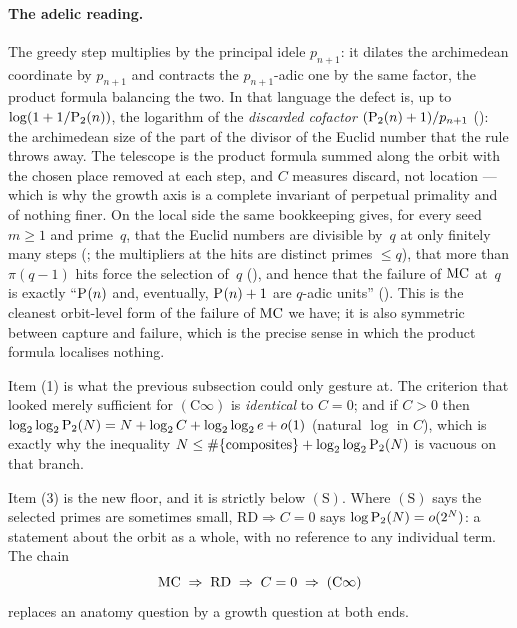 \paragraph{The adelic reading.}
The greedy step multiplies by the principal idele $p_{n+1}$: it dilates
the archimedean coordinate by $p_{n+1}$ and contracts the $p_{n+1}$-adic
one by the same factor, the product formula balancing the two.  In that
language the defect is, up to $\log(1 + 1/\mathrm{P}_{2}(n))$, the logarithm of
the \emph{discarded cofactor} $(\mathrm{P}_{2}(n)+1)/p_{n+1}$
(): the
archimedean size of the part of the divisor of the Euclid number that the
rule throws away.  The telescope is the product formula summed along the
orbit with the chosen place removed at each step, and $C$ measures
discard, not location --- which is why the growth axis is a complete
invariant of perpetual primality and of nothing finer.  On the local side
the same bookkeeping gives, for every seed $m \ge 1$ and prime~$q$, that
the Euclid numbers are divisible by~$q$ at only finitely many steps
(; the multipliers at
the hits are distinct primes $\le q$), that more than $\pi(q-1)$ hits force
the selection of~$q$
(), and
hence that the failure of $\mathrm{MC}$ at~$q$ is exactly ``$\mathrm{P}_{}(n)$ and,
eventually, $\mathrm{P}_{}(n)+1$ are $q$-adic units''
().
This is the cleanest orbit-level form of the failure of $\mathrm{MC}$ we have; it
is also symmetric between capture and failure, which is the precise sense
in which the product formula localises nothing.

\noindent
Item (1) is what the previous subsection could only gesture at.  The
criterion that looked merely sufficient for $(\mathrm{C}\infty)$ is
\emph{identical} to $C = 0$; and if $C > 0$ then
$\log_2\log_2 \mathrm{P}_{2}(N) = N + \log_2 C + \log_2\log_2 e + o(1)$ (natural
$\log$ in $C$), which is exactly why the
inequality $N \leq \#\{\text{composites}\} + \log_2\log_2\mathrm{P}_{2}(N)$ is
vacuous on that branch.

Item (3) is the new floor, and it is strictly below $(\mathrm{S})$.  Where
$(\mathrm{S})$ says the selected primes are sometimes small,
$\mathrm{RD} \Rightarrow C = 0$ says $\log \mathrm{P}_{2}(N) = o(2^{N})$: a
statement about the orbit as a whole, with no reference to any individual
term.  The chain
\[
  \mathrm{MC} \;\Rightarrow\; \mathrm{RD} \;\Rightarrow\; C = 0
  \;\Rightarrow\; (\mathrm{C}\infty)
\]
replaces an anatomy question by a growth question at both ends.


